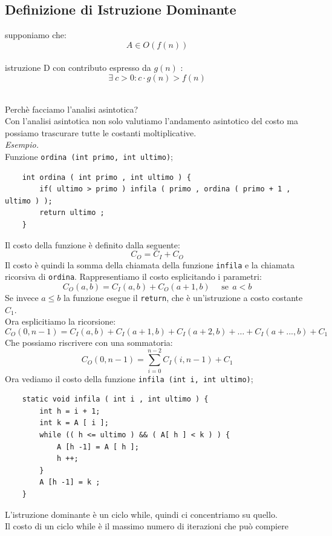 \subsection{\texorpdfstring{Definizione di Istruzione Dominante}{Definizione di Istruzione DOMINANTE}}
\colorbox{SALZO}{\parbox{\dimexpr\linewidth-2\fboxsep}{\begin{definition}
   supponiamo che:
      $$ A \in O(f(n)) $$
   \\istruzione D con contributo espresso da $g(n)$ : 
   $$\exists \ c > 0 : c \cdot g(n) > f(n) $$
\end{definition}}}\medskip\\ 
Perchè facciamo l'analisi asintotica?\\
Con l'analisi asintotica non solo valutiamo l'andamento asintotico del costo ma possiamo trascurare tutte le costanti moltiplicative.\smallskip\\
\textit{Esempio.} \\
Funzione \texttt{ordina (int primo, int ultimo)};
\begin{verbatim}
    int ordina ( int primo , int ultimo ) {
        if( ultimo > primo ) infila ( primo , ordina ( primo + 1 , ultimo ) );
        return ultimo ;
    }
\end{verbatim}
Il costo della funzione è definito dalla seguente:
$$C_O = C_I + C_O $$
Il costo è quindi la somma della chiamata della funzione \texttt{infila} e la chiamata ricorsiva di \texttt{ordina}. Rappresentiamo il costo esplicitando i parametri:
$$C_O(a,b) = C_I(a,b) + C_O(a+1,b)\ \ \ \ \ \ \text{se}\ \ a<b$$
Se invece $a \le b$ la funzione esegue il \texttt{return}, che è un'istruzione a costo costante $C_1$.\\
Ora esplicitiamo la ricorsione:
$$C_O (0, n-1) = C_I (a,b) + C_I (a+1,b) + C_I (a+2,b) + \dots +  C_I(a+..., b) + C_1$$ 
Che possiamo riscrivere con una sommatoria:
$$C_O (0,n-1) = \sum_{i = 0}^{n-2}C_I(i, n-1) +C_1$$
Ora vediamo il costo della funzione \texttt{infila (int i, int ultimo)};
\begin{verbatim}
    static void infila ( int i , int ultimo ) {
        int h = i + 1;
        int k = A [ i ];
        while (( h <= ultimo ) && ( A[ h ] < k ) ) {
            A [h -1] = A [ h ];
            h ++;
        }
        A [h -1] = k ;
    }
\end{verbatim}
L'istruzione dominante è un ciclo while, quindi ci concentriamo su quello.\\ 
Il costo di un ciclo while è il massimo numero di iterazioni che può compiere
